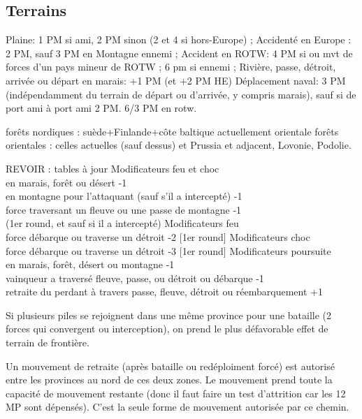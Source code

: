 \subsection{Terrains}

\bparag Plaine: 1 PM si ami, 2 PM sinon (2 et 4 si hors-Europe) ;
\bparag Accidenté en Europe : 2 PM, sauf 3 PM en Montagne ennemi ;
\bparag Accident en ROTW: 4 PM si ou mvt de forces d'un pays mineur de
ROTW ; 6 pm si ennemi ;
\bparag Rivière, passe, détroit, arrivée ou départ en marais: +1 PM (et
+2 PM HE)
\bparag Déplacement naval: 3 PM (indépendamment du terrain de départ ou
d'arrivée, y compris marais), sauf si de port ami à port ami 2 PM. 6/3
PM en rotw.

\bparag  forêts nordiques : suède+Finlande+côte baltique actuellement orientale
\bparag forêts orientales : celles actuelles (sauf dessus) et Prussia et
adjacent, Lovonie, Podolie.


\label{chMilitary:Battle:Forests} REVOIR : tables à jour
\bparag  Modificateurs feu et choc \\
	en marais, forêt ou désert -1 \\
	en montagne pour l'attaquant (sauf s'il a intercepté) -1 \\
	force traversant un fleuve ou une passe de montagne -1 \\
		(1er round, et sauf si il a intercepté)
\bparag Modificateurs feu \\
	force débarque ou traverse un détroit -2 [1er round]
\bparag Modificateurs choc \\
	force débarque ou traverse un détroit -3 [1er round]
\bparag Modificateurs poursuite\\
	en marais, forêt, désert ou montagne -1 \\
	vainqueur a traversé fleuve, passe, ou détroit ou débarque -1 \\
	retraite du perdant à travers passe, fleuve, détroit ou réembarquement +1

\aparag Si plusieurs piles se rejoignent dans une même province pour
une bataille (2 forces qui convergent ou interception), on prend le plus
défavorable effet de terrain de frontière.

 Un mouvement de retraite (après bataille ou
redéploiment forcé) est autorisé entre les provinces au
nord de ces deux zones. Le mouvement prend toute la capacité de mouvement
restante (donc il faut faire un test d'attrition car les 12 MP sont dépensés).
C'est la seule forme de mouvement autorisée par ce chemin.

